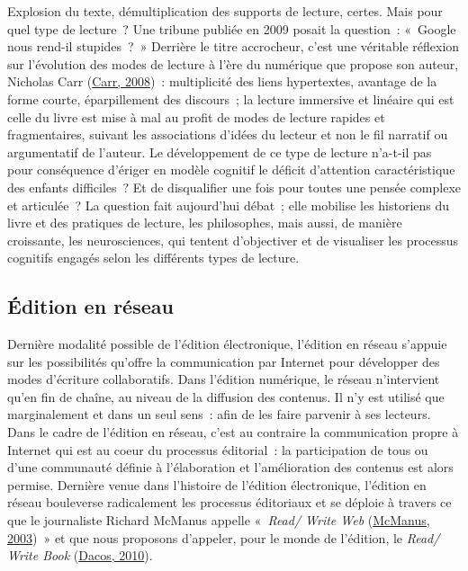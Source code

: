 \documentclass[12pt,french,letterpaper,]{article}
\begin{document}
Explosion du texte, démultiplication des supports de lecture, certes.
Mais pour quel type de lecture~? Une tribune publiée en 2009 posait la
question~: «~Google nous rend-il stupides~?~» Derrière le titre
accrocheur, c'est une véritable réflexion sur l'évolution des modes de
lecture à l'ère du numérique que propose son auteur, Nicholas Carr
(\protect\hyperlink{ref-carr_is_2008}{Carr, 2008})~: multiplicité des
liens hypertextes, avantage de la forme courte, éparpillement des
discours~; la lecture immersive et linéaire qui est celle du livre est
mise à mal au profit de modes de lecture rapides et fragmentaires,
suivant les associations d'idées du lecteur et non le fil narratif ou
argumentatif de l'auteur. Le développement de ce type de lecture
n'a-t-il pas pour conséquence d'ériger en modèle cognitif le déficit
d'attention caractéristique des enfants difficiles~? Et de disqualifier
une fois pour toutes une pensée complexe et articulée~? La question fait
aujourd'hui débat~; elle mobilise les historiens du livre et des
pratiques de lecture, les philosophes, mais aussi, de manière
croissante, les neurosciences, qui tentent d'objectiver et de visualiser
les processus cognitifs engagés selon les différents types de lecture.

\hypertarget{uxe9dition-en-ruxe9seau}{%
\subsection{Édition en réseau}\label{uxe9dition-en-ruxe9seau}}

Dernière modalité possible de l'édition électronique, l'édition en
réseau s'appuie sur les possibilités qu'offre la communication par
Internet pour développer des modes d'écriture collaboratifs. Dans
l'édition numérique, le réseau n'intervient qu'en fin de chaîne, au
niveau de la diffusion des contenus. Il n'y est utilisé que
marginalement et dans un seul sens~: afin de les faire parvenir à ses
lecteurs. Dans le cadre de l'édition en réseau, c'est au contraire la
communication propre à Internet qui est au coeur du processus
éditorial~: la participation de tous ou d'une communauté définie à
l'élaboration et l'amélioration des contenus est alors permise. Dernière
venue dans l'histoire de l'édition électronique, l'édition en réseau
bouleverse radicalement les processus éditoriaux et se déploie à travers
ce que le journaliste Richard McManus appelle «~\emph{Read/ Write Web}
(\protect\hyperlink{ref-mcmanus_readwrite_2003}{McManus, 2003})~» et que
nous proposons d'appeler, pour le monde de l'édition, le \emph{Read/
Write Book} (\protect\hyperlink{ref-dacos_read-write_2010}{Dacos,
2010}).
\end{document}
